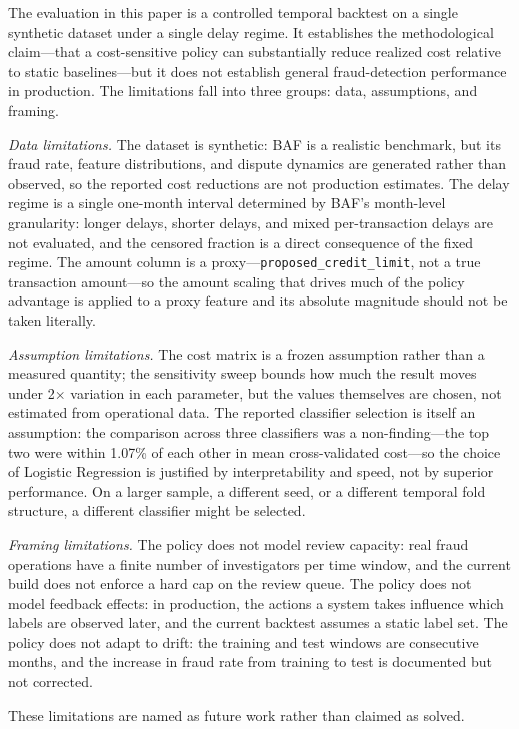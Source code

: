 \documentclass[conference]{IEEEtran}
\begin{document}
The evaluation in this paper is a controlled temporal backtest on a single
synthetic dataset under a single delay regime. It establishes the
methodological claim---that a cost-sensitive policy can substantially
reduce realized cost relative to static baselines---but it does not
establish general fraud-detection performance in production. The
limitations fall into three groups: data, assumptions, and framing.

\emph{Data limitations.} The dataset is synthetic: BAF is a realistic
benchmark, but its fraud rate, feature distributions, and dispute dynamics
are generated rather than observed, so the reported cost reductions are
not production estimates. The delay regime is a single one-month interval
determined by BAF's month-level granularity: longer delays, shorter
delays, and mixed per-transaction delays are not evaluated, and the
censored fraction is a direct consequence of the fixed regime. The amount
column is a proxy---\texttt{proposed\_credit\_limit}, not a true
transaction amount---so the amount scaling that drives much of the
policy advantage is applied to a proxy feature and its absolute magnitude
should not be taken literally.

\emph{Assumption limitations.} The cost matrix is a frozen assumption
rather than a measured quantity; the sensitivity sweep bounds how much
the result moves under 2$\times$ variation in each parameter, but the
values themselves are chosen, not estimated from operational data. The
reported classifier selection is itself an assumption: the comparison
across three classifiers was a non-finding---the top two were within
1.07\% of each other in mean cross-validated cost---so the choice of
Logistic Regression is justified by interpretability and speed, not by
superior performance. On a larger sample, a different seed, or a
different temporal fold structure, a different classifier might be
selected.

\emph{Framing limitations.} The policy does not model review capacity:
real fraud operations have a finite number of investigators per time
window, and the current build does not enforce a hard cap on the review
queue. The policy does not model feedback effects: in production, the
actions a system takes influence which labels are observed later, and
the current backtest assumes a static label set. The policy does not
adapt to drift: the training and test windows are consecutive months,
and the increase in fraud rate from training to test is documented but
not corrected.

These limitations are named as future work rather than claimed as solved.
\end{document}
